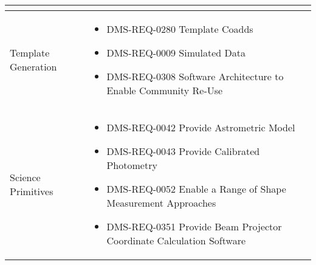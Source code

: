 \begin{xtabular}{lp{0.7\textwidth}}
\begin{itemize}
\end{itemize} \\ \hline
Template Generation &
\begin{itemize}
\item DMS-REQ-0280 Template Coadds
\item DMS-REQ-0009 Simulated Data
\item DMS-REQ-0308 Software Architecture to Enable Community Re-Use
\end{itemize} \\ \hline
Science Primitives &
\begin{itemize}
\item DMS-REQ-0042 Provide Astrometric Model
\item DMS-REQ-0043 Provide Calibrated Photometry
\item DMS-REQ-0052 Enable a Range of Shape Measurement Approaches
\item DMS-REQ-0351 Provide Beam Projector Coordinate Calculation Software
\end{itemize} \\ \hline
\end{xtabular}
